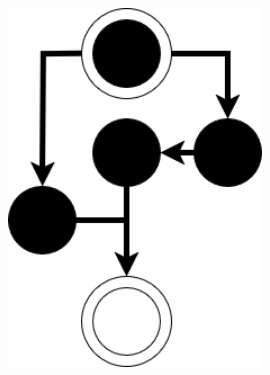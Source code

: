\documentclass[12pt,a4paper]{article} %
\begin{document}
	\begin{figure}[H]
		\centering
		\begin{minipage}[b]{0.3\textwidth}
			\centering
		\end{minipage}
		\begin{minipage}[b]{0.3\textwidth}
			\centering
			\includegraphics[width=0.6\textwidth]{images/workflow_icon.png}
		\end{minipage}
		\begin{minipage}[b]{0.3\textwidth}
			\centering

\end{minipage}
\end{figure}
\end{document}
